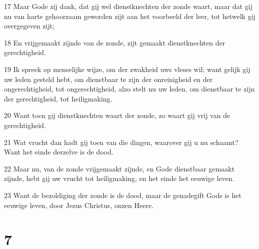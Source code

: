 \par 17 Maar Gode zij dank, dat gij wel dienstknechten der zonde waart, maar dat gij nu van harte gehoorzaam geworden zijt aan het voorbeeld der leer, tot hetwelk gij overgegeven zijt;
\par 18 En vrijgemaakt zijnde van de zonde, zijt gemaakt dienstknechten der gerechtigheid.
\par 19 Ik spreek op menselijke wijze, om der zwakheid uws vleses wil; want gelijk gij uw leden gesteld hebt, om dienstbaar te zijn der onreinigheid en der ongerechtigheid, tot ongerechtigheid, alzo stelt nu uw leden, om dienstbaar te zijn der gerechtigheid, tot heiligmaking.
\par 20 Want toen gij dienstknechten waart der zonde, zo waart gij vrij van de gerechtigheid.
\par 21 Wat vrucht dan hadt gij toen van die dingen, waarover gij u nu schaamt? Want het einde derzelve is de dood.
\par 22 Maar nu, van de zonde vrijgemaakt zijnde, en Gode dienstbaar gemaakt zijnde, hebt gij uw vrucht tot heiligmaking, en het einde het eeuwige leven.
\par 23 Want de bezoldiging der zonde is de dood, maar de genadegift Gods is het eeuwige leven, door Jezus Christus, onzen Heere.

\chapter{7}

